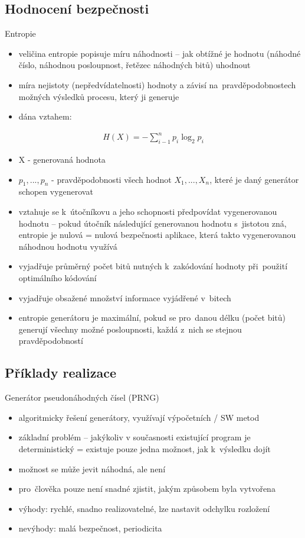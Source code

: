 \subsection{Hodnocení bezpečnosti}
Entropie
\begin{itemize}
    \item veličina entropie popisuje míru náhodnosti -- jak obtížné je hodnotu (náhodné číslo, náhodnou posloupnost, řetězec náhodných bitů) uhodnout
    \item míra nejistoty (nepředvídatelnosti) hodnoty a závisí na~pravděpodobnostech možných výsledků procesu, který ji generuje
    \item dána vztahem:
\end{itemize}
\begin{align*}
    H(X) = - \displaystyle\sum\limits_{i-1}^n p_{i} \log_2 p_{i} 
\end{align*}
\begin{itemize}
    \item X - generovaná hodnota
    \item $p_{1},..., p_{n}$ - pravděpodobnosti všech hodnot $X_{1},..., X_{n}$, které je daný generátor schopen vygenerovat
    \item vztahuje se k~útočníkovu a jeho schopnosti předpovídat vygenerovanou hodnotu -- pokud útočník následující generovanou hodnotu s~jistotou zná, entropie je nulová = nulová bezpečnosti aplikace, která takto vygenerovanou náhodnou hodnotu využívá
    \item vyjadřuje průměrný počet bitů nutných k~zakódování hodnoty při~použití optimálního kódování
    \item vyjadřuje obsažené množství informace vyjádřené v~bitech
    \item entropie generátoru je maximální, pokud se pro~danou délku (počet bitů) generují všechny možné posloupnosti, každá z~nich se stejnou pravděpodobností
\end{itemize}

\subsection{Příklady realizace}
Generátor pseudonáhodných čísel (PRNG)
\begin{itemize}
    \item algoritmicky řešení generátory, využívají výpočetních / SW metod
    \item základní problém -- jakýkoliv v současnosti existující program je deterministický = existuje pouze jedna možnost, jak k~výsledku dojít
    \item možnost se může jevit náhodná, ale není
    \item pro~člověka pouze není snadné zjistit, jakým způsobem byla vytvořena
    \item výhody: rychlé, snadno realizovatelné, lze nastavit odchylku rozložení
    \item nevýhody: malá bezpečnost, periodicita
\end{itemize}

